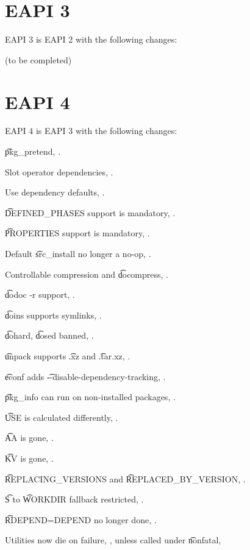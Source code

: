 \section*{EAPI 3}

EAPI 3 is EAPI 2 with the following changes:
\begin{compactitem}
\item (to be completed)
\end{compactitem}

\section*{EAPI 4}

EAPI 4 is EAPI 3 with the following changes:

\begin{compactitem}
\item \t{pkg\_pretend}, .
\item Slot operator dependencies, .
\item Use dependency defaults, .
\item \t{DEFINED\_PHASES} support is mandatory, .
\item \t{PROPERTIES} support is mandatory, .
\item Default \t{src\_install} no longer a no-op, .
\item Controllable compression and \t{docompress}, .
\item \t{dodoc -r} support, .
\item \t{doins} supports symlinks, .
\item \t{dohard}, \t{dosed} banned, .
\item \t{unpack} supports \t{.xz} and \t{.tar.xz}, .
\item \t{econf} adds \t{-{}-disable-dependency-tracking}, .
\item \t{pkg\_info} can run on non-installed packages, .
\item \t{USE} is calculated differently, .
\item \t{AA} is gone, .
\item \t{KV} is gone, .
\item \t{REPLACING\_VERSIONS} and \t{REPLACED\_BY\_VERSION}, .
\item \t{S} to \t{WORKDIR} fallback restricted, .
\item \t{RDEPEND=DEPEND} no longer done, .
\item Utilities now die on failure, , unless called under \t{nonfatal},
\end{compactitem}


